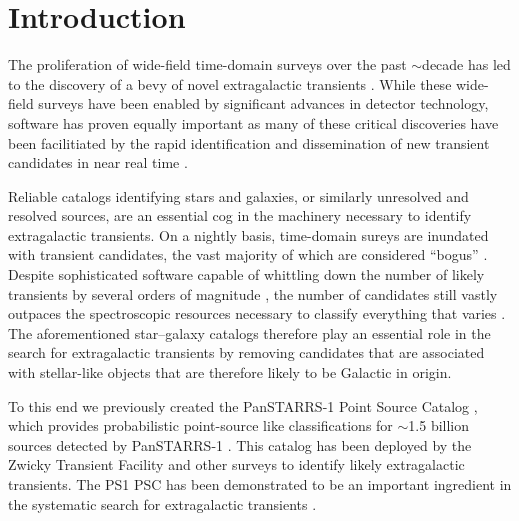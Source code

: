 \documentclass[twocolumn]{aastex63}
\begin{document}
\section{Introduction} \label{sec:intro}

The proliferation of wide-field time-domain surveys over the past $\sim$decade
has led to the discovery of a bevy of novel extragalactic transients
\citep[e.g.,][]{quimby11,Gezari12,Drout14,Gal-Yam14,Abbott17a,Prentice18,
IceCube-Collaboration18}. While these wide-field surveys have been enabled by
significant advances in detector technology, software has proven equally
important \citep[e.g.,][]{Masci17,Masci19,Smith20,Jones20} as many of these
critical discoveries have been facilitiated by the rapid identification and
dissemination of new transient candidates in near real time
\citep[e.g.,][]{Patterson19}.

Reliable catalogs identifying stars and galaxies, or similarly unresolved and
resolved sources, are an essential cog in the machinery necessary to identify
extragalactic transients. On a nightly basis, time-domain sureys are inundated
with transient candidates, the vast majority of which are considered ``bogus''
\citep[e.g.,][]{Bloom12}. Despite sophisticated software capable of whittling
down the number of likely transients by several orders of magnitude
\citep[e.g.,][]{Brink13,Goldstein15,Duev19,Smith20}, the number of candidates
still vastly outpaces the spectroscopic resources necessary to classify
everything that varies \citep[e.g.,][]{Kulkarni20}. The aforementioned
star--galaxy catalogs therefore play an essential role in the search for
extragalactic transients by removing candidates that are associated with
stellar-like objects that are therefore likely to be Galactic in origin.

To this end we previously created the PanSTARRS-1 Point Source Catalog
\citep[PS1 PSC][]{Tachibana18}, which provides probabilistic point-source like
classifications for $\sim$1.5 billion sources detected by PanSTARRS-1
\citep[PS1;][]{Chambers16}. This catalog has been deployed by the Zwicky
Transient Facility \citep[ZTF;][]{Bellm19} and other surveys
\citep{Smith20,Moller20} to identify likely extragalactic transients. The PS1
PSC has been demonstrated to be an important ingredient in the systematic
search for extragalactic transients \citep{Fremling20,De20}.
\end{document}
